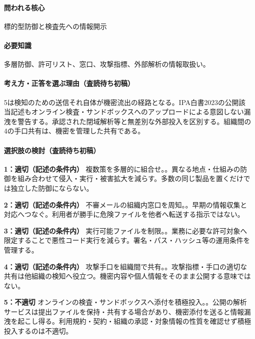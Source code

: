\paragraph{問われる核心} 標的型防御と検査先への情報開示

\paragraph{必要知識} 多層防御、許可リスト、窓口、攻撃指標、外部解析の情報取扱い。

\paragraph{考え方・正答を選ぶ理由（査読待ち初稿）} 5は検知のための送信それ自体が機密流出の経路となる。IPA白書2023の公開該当記述もオンライン検査・サンドボックスへのアップロードによる意図しない漏洩を警告する。承認された閉域解析等と無差別な外部投入を区別する。組織間の4の手口共有は、機密を管理した共有である。

\paragraph{選択肢の検討（査読待ち初稿）}\mbox{}\par

\noindent\textbf{1：適切（記述の条件内）} 複数策を多層的に組合せ。。異なる地点・仕組みの防御を組み合わせて侵入・実行・被害拡大を減らす。多数の同じ製品を置くだけでは独立した防御にならない。\par

\noindent\textbf{2：適切（記述の条件内）} 不審メールの組織内窓口を周知。。早期の情報収集と対応へつなぐ。利用者が勝手に危険ファイルを他者へ転送する指示ではない。\par

\noindent\textbf{3：適切（記述の条件内）} 実行可能ファイルを制限。。業務に必要な許可対象へ限定することで悪性コード実行を減らす。署名・パス・ハッシュ等の運用条件を管理する。\par

\noindent\textbf{4：適切（記述の条件内）} 攻撃手口を組織間で共有。。攻撃指標・手口の適切な共有は他組織の検知へ役立つ。機密内容や個人情報をそのまま公開する意味ではない。\par

\noindent\textbf{5：不適切} オンラインの検査・サンドボックスへ添付を積極投入。。公開の解析サービスは提出ファイルを保持・共有する場合があり、機密添付を送ると情報漏洩を起こし得る。利用規約・契約・組織の承認・対象情報の性質を確認せず積極投入するのは不適切。\par

